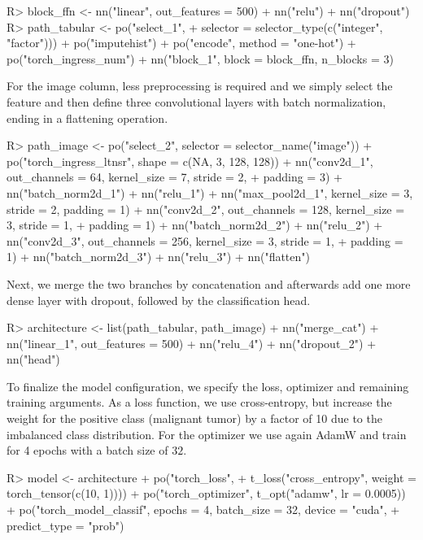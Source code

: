 \documentclass[article]{jss}
\theoremstyle{definition}
\begin{document}
\begin{CodeInput}
R> block_ffn <- nn("linear", out_features = 500) %
+    nn("relu") %
+    nn("dropout")
R> path_tabular <- po("select_1",
+      selector = selector_type(c("integer", "factor"))) %
+    po("imputehist") %
+    po("encode", method = "one-hot") %
+    po("torch_ingress_num") %
+    nn("block_1", block = block_ffn, n_blocks = 3)
\end{CodeInput}

For the image column, less preprocessing is required and we simply select the feature and then define three convolutional layers with batch normalization, ending in a flattening operation.

\begin{CodeInput}
R> path_image <- po("select_2", selector = selector_name("image")) %
    +    po("torch_ingress_ltnsr", shape = c(NA, 3, 128, 128)) %
+    nn("conv2d_1", out_channels = 64, kernel_size = 7, stride = 2,
+      padding = 3) %
+    nn("batch_norm2d_1") %
+    nn("relu_1") %
+    nn("max_pool2d_1", kernel_size = 3, stride = 2, padding = 1) %
+    nn("conv2d_2", out_channels = 128, kernel_size = 3, stride = 1,
+      padding = 1) %
+    nn("batch_norm2d_2") %
+    nn("relu_2") %
+    nn("conv2d_3", out_channels = 256, kernel_size = 3, stride = 1,
+      padding = 1) %
+    nn("batch_norm2d_3") %
+    nn("relu_3") %
+    nn("flatten")
\end{CodeInput}

Next, we merge the two branches by concatenation and afterwards add one more dense layer with dropout, followed by the classification head.

\begin{CodeInput}
R> architecture <- list(path_tabular, path_image) %
+    nn("merge_cat") %
+    nn("linear_1", out_features = 500) %
+    nn("relu_4") %
+    nn("dropout_2") %
+    nn("head")
\end{CodeInput}

To finalize the model configuration, we specify the loss, optimizer and remaining training arguments.
As a loss function, we use cross-entropy, but increase the weight for the positive class (malignant tumor) by a factor of 10 due to the imbalanced class distribution.
For the optimizer we use again AdamW and train for 4 epochs with a batch size of $32$.

\begin{CodeInput}
R> model <- architecture %
+    po("torch_loss",
+      t_loss("cross_entropy", weight = torch_tensor(c(10, 1)))) %
+    po("torch_optimizer", t_opt("adamw", lr = 0.0005)) %
+    po("torch_model_classif", epochs = 4, batch_size = 32, device = "cuda",
+      predict_type = "prob")
\end{CodeInput}
\end{document}
